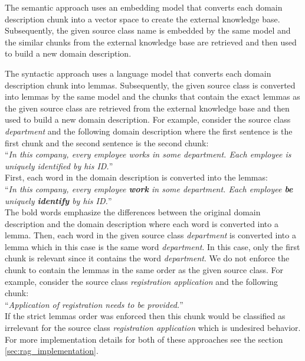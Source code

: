The semantic approach uses an embedding model that converts each domain description chunk into a vector space to create the external knowledge base. Subsequently, the given source class name is embedded by the same model and the similar chunks from the external knowledge base are retrieved and then used to build a new domain description.

The syntactic approach uses a language model that converts each domain description chunk into lemmas. Subsequently, the given source class is converted into lemmas by the same model and the chunks that contain the exact lemmas as the given source class are retrieved from the external knowledge base and then used to build a new domain description. For example, consider the source class \textit{department} and the following domain description where the first sentence is the first chunk and the second sentence is the second chunk: \\

\noindent{}``\textit{In this company, every employee works in some department. Each employee is uniquely identified by his ID.}'' \\

\noindent{}First, each word in the domain description is converted into the lemmas: \\

\noindent{}``\textit{In this company, every employee \textbf{work} in some department. Each employee \textbf{be} uniquely \textbf{identify} by his ID.}'' \\

\noindent{}The bold words emphasize the differences between the original domain description and the domain description where each word is converted into a lemma. Then, each word in the given source class \textit{department} is converted into a lemma which in this case is the same word \textit{department}.  In this case, only the first chunk is relevant since it contains the word \textit{department}. We do not enforce the chunk to contain the lemmas in the same order as the given source class. For example, consider the source class \textit{registration application} and the following chunk: \\

\noindent{}``\textit{Application of registration needs to be provided.}'' \\

\noindent{}If the strict lemmas order was enforced then this chunk would be classified as irrelevant for the source class \textit{registration application} which is undesired behavior. For more implementation details for both of these approaches see the section \ref{sec:rag_implementation}.


